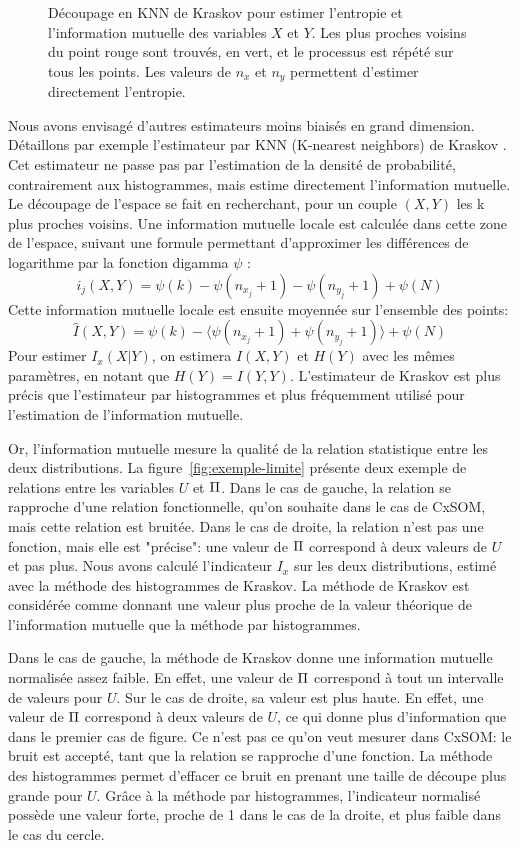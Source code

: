\begin{figure}
\begin{minipage}{0.4\textwidth}
        \caption{Découpage en KNN de Kraskov pour estimer l'entropie et l'information mutuelle des variables $X$ et $Y$. Les plus proches voisins du point rouge sont trouvés, en vert, et le processus est répété sur tous les points. Les valeurs de $n_x$ et $n_y$ permettent d'estimer directement l'entropie.}
        \label{fig:kraskov}
\end{minipage}
\end{figure}

Nous avons envisagé d'autres estimateurs moins biaisés en grand dimension. Détaillons par exemple l'estimateur par KNN (K-nearest neighbors) de Kraskov \cite{2004kraskov}. 
Cet estimateur ne passe pas par l'estimation de la densité de probabilité, contrairement aux histogrammes, mais estime directement l'information mutuelle.
Le découpage de l'espace se fait en recherchant, pour un couple $(X,Y)$ les k plus proches voisins. Une information mutuelle locale est calculée dans cette zone de l'espace, suivant une formule permettant d'approximer les différences de logarithme par la fonction digamma $\psi$ : 
$$i_j(X,Y) = \psi(k) - \psi(n_{x_j} + 1) - \psi(n_{y_j} +1) + \psi(N)$$
Cette information mutuelle locale est ensuite moyennée sur l'ensemble des points: 
$$\hat{I}(X,Y) = \psi(k) - \langle\psi(n_{x_j} + 1) + \psi(n_{y_j} +1)\rangle + \psi(N)$$
Pour estimer $I_x(X|Y)$, on estimera $I(X,Y)$ et $H(Y)$ avec les mêmes paramètres, en notant que $H(Y) = I(Y,Y)$.
L'estimateur de Kraskov est plus précis que l'estimateur par histogrammes et plus fréquemment utilisé pour l'estimation de l'information mutuelle. 

Or, l'information mutuelle mesure la qualité de la relation statistique entre les deux distributions. La figure~\ref{fig:exemple-limite} présente deux exemple de relations entre les variables $U$ et $\Pi$. Dans le cas de gauche, la relation se rapproche d'une relation fonctionnelle, qu'on souhaite dans le cas de CxSOM, mais cette relation est bruitée. Dans le cas de droite, la relation n'est pas une fonction, mais elle est "précise": une valeur de $\Pi$ correspond à deux valeurs de $U$ et pas plus.
Nous avons calculé l'indicateur $I_x$ sur les deux distributions, estimé avec la méthode des histogrammes de Kraskov. La méthode de Kraskov est considérée comme donnant une valeur plus proche de la valeur théorique de l'information mutuelle que la méthode par histogrammes. 

Dans le cas de gauche, la méthode de Kraskov donne une information mutuelle normalisée assez faible. En effet, une valeur de $\Pi$ correspond à tout un intervalle de valeurs pour $U$. Sur le cas de droite, sa valeur est plus haute. En effet, une valeur de $\Pi$ correspond à deux valeurs de $U$, ce qui donne plus d'information que dans le premier cas de figure. Ce n'est pas ce qu'on veut mesurer dans CxSOM: le bruit est accepté, tant que la relation se rapproche d'une fonction.
La méthode des histogrammes permet d'effacer ce bruit en prenant une taille de découpe plus grande pour $U$. Grâce à la méthode par histogrammes, l'indicateur normalisé possède une valeur forte, proche de 1 dans le cas de la droite, et plus faible dans le cas du cercle.

